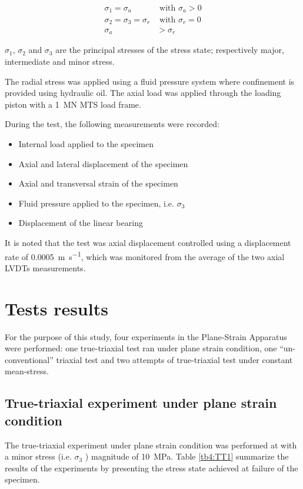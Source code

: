\begin{align}
    \sigma_1 = \sigma_a &\text{ with } \sigma_a > 0 \\
    \sigma_2 = \sigma_3 = \sigma_r  &\text{ with } \sigma_r = 0 \\
    \sigma_a &> \sigma_r
\end{align}

$\sigma_1$, $\sigma_2$  and  $\sigma_3$  are the principal stresses of the stress state; respectively major, intermediate and minor stress.

The radial stress was applied using a fluid pressure system where confinement is provided using hydraulic oil. The axial load was applied through the loading piston with a \SI{1}{MN} MTS load frame. 

During the test, the following measurements were recorded: 

\begin{itemize}
    \item Internal load applied to the specimen 
    \item Axial and lateral displacement of the specimen 
    \item Axial and transversal strain of the specimen
    \item Fluid pressure applied to the specimen, i.e. $\sigma_3$
    \item Displacement of the linear bearing
\end{itemize}

It is noted that the test was axial displacement controlled using a displacement rate of \SI{0.0005}{\meter\per\second}, which was monitored from the average of the two axial LVDTs measurements. 

\section{Tests results}

For the purpose of this study, four experiments in the Plane-Strain Apparatus were performed: one true-triaxial test ran under plane strain condition, one “un-conventional” triaxial test and two attempts of true-triaxial test under constant mean-stress. 

\subsection{True-triaxial experiment under plane strain condition}

The true-triaxial experiment under plane strain condition was performed at with a minor stress (i.e. $\sigma_3$ ) magnitude of \SI{10}{MPa}. Table \ref{tb4:TT1} summarize the results of the experiments by presenting the stress state achieved at failure of the specimen.

